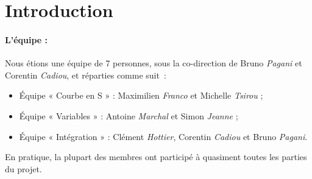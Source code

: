 \section*{Introduction}


\paragraph{L’équipe :}
Nous étions une équipe de 7 personnes, sous la co-direction de Bruno
\textit{Pagani} et Corentin \textit{Cadiou}, et réparties comme suit :
\begin{itemize}
    \item Équipe « Courbe en S » : Maximilien \textit{Franco} et Michelle \textit{Tsirou} ;
    \item Équipe « Variables » : Antoine \textit{Marchal} et Simon \textit{Jeanne} ;
    \item Équipe « Intégration » : Clément \textit{Hottier}, Corentin \textit{Cadiou} et Bruno \textit{Pagani}.
\end{itemize}

En pratique, la plupart des membres ont participé à quasiment toutes les
parties du projet.
